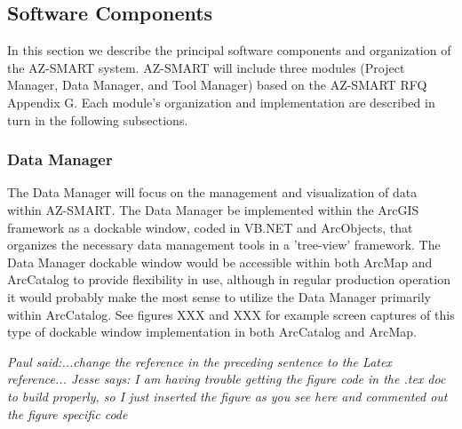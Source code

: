 \subsection{Software Components}

In this section we describe the principal software components and organization of the AZ-SMART system.  AZ-SMART will include three modules (Project Manager, Data Manager, and Tool Manager) based on the AZ-SMART RFQ Appendix G. Each module's organization and implementation are described in turn in the following subsections.



\subsubsection{Data Manager}

The Data Manager will focus on the management and visualization of data within AZ-SMART.  The Data Manager be implemented within the ArcGIS framework as a dockable window, coded in VB.NET and ArcObjects, that organizes the necessary data management tools in a 'tree-view' framework.  The Data Manager dockable window would be accessible within both ArcMap and ArcCatalog to provide flexibility in use, although in regular production operation it would probably make the most sense to utilize the Data Manager primarily within ArcCatalog.  See figures XXX and XXX for example screen captures of this type of dockable window implementation in both ArcCatalog and ArcMap. 

\emph{Paul said:...change the reference in the preceding sentence to the Latex reference... Jesse says: I am having trouble getting the figure code in the .tex doc to build properly, so I just inserted the figure as you see here and commented out the figure specific code}

